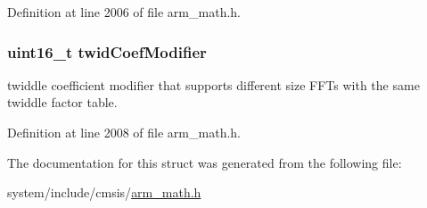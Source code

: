 Definition at line 2006 of file arm\+\_\+math.\+h.

\subsubsection[{\texorpdfstring{twid\+Coef\+Modifier}{twidCoefModifier}}]{\setlength{\rightskip}{0pt plus 5cm}uint16\+\_\+t twid\+Coef\+Modifier}\hypertarget{structarm__cfft__radix2__instance__q31_afe772e5b5001c9d8e85032115a8df5bf}{}\label{structarm__cfft__radix2__instance__q31_afe772e5b5001c9d8e85032115a8df5bf}
twiddle coefficient modifier that supports different size F\+F\+Ts with the same twiddle factor table. 

Definition at line 2008 of file arm\+\_\+math.\+h.



The documentation for this struct was generated from the following file\+:\begin{DoxyCompactItemize}
\item 
system/include/cmsis/\hyperlink{arm__math_8h}{arm\+\_\+math.\+h}\end{DoxyCompactItemize}
